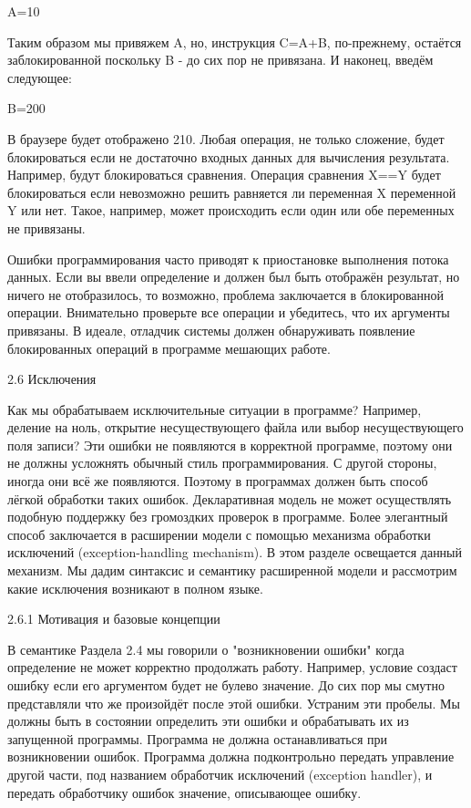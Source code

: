 A=10

Таким образом мы привяжем A, но, инструкция C=A+B, по-прежнему, остаётся заблокированной поскольку B - до сих пор не привязана. И наконец, введём следующее:

B=200

В браузере будет отображено 210. Любая операция, не только сложение, будет блокироваться если не достаточно входных данных для вычисления результата. Например, будут блокироваться сравнения. Операция сравнения X==Y будет блокироваться если невозможно решить равняется ли переменная X переменной Y или нет. Такое, например, может происходить если один или обе переменных не привязаны.

Ошибки программирования часто приводят к приостановке выполнения потока данных. Если вы ввели определение и должен был быть отображён результат, но ничего не отобразилось, то возможно, проблема заключается в блокированной операции. Внимательно проверьте все операции и убедитесь, что их аргументы привязаны. В идеале, отладчик системы должен обнаруживать появление блокированных операций в программе мешающих работе.

2.6 Исключения

Как мы обрабатываем исключительные ситуации в программе? Например, деление на ноль, открытие несуществующего файла или выбор несуществующего поля записи? Эти ошибки не появляются в корректной программе, поэтому они не должны усложнять обычный стиль программирования. С другой стороны, иногда они всё же появляются. Поэтому в программах должен быть способ лёгкой обработки таких ошибок. Декларативная модель не может осуществлять подобную поддержку без громоздких проверок в программе. Более элегантный способ заключается в расширении модели с помощью механизма обработки исключений (exception-handling mechanism). В этом разделе освещается данный механизм. Мы дадим синтаксис и семантику расширенной модели и рассмотрим какие исключения возникают в полном языке.

2.6.1 Мотивация и базовые концепции

В семантике Раздела 2.4 мы говорили о "возникновении ошибки" когда определение не может корректно продолжать работу. Например, условие создаст ошибку если его аргументом будет не булево значение. До сих пор мы смутно представляли что же произойдёт после этой ошибки. Устраним эти пробелы. Мы должны быть в состоянии определить эти ошибки и обрабатывать их из запущенной программы. Программа не должна останавливаться при возникновении ошибок. Программа должна подконтрольно передать управление другой части, под названием обработчик исключений (exception handler), и передать обработчику ошибок значение, описывающее ошибку.

